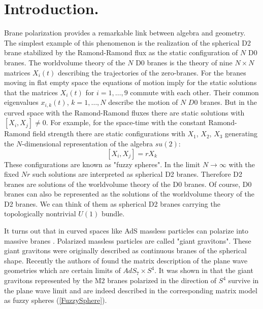 \documentclass[a4paper,12pt]{article}
\begin{document}
\section{Introduction.}
Brane polarization \cite{Myers} provides a remarkable link
between algebra and geometry. The simplest example of this
phenomenon is the realization of the spherical D2 brane
stabilized by the Ramond-Ramond flux as the static configuration
of $N$ D0 branes. The worldvolume theory of the $N$ D0 branes
is the theory of nine $N\times N$ matrices $X_i(t)$ describing the
trajectories of the zero-branes\cite{BoundStates}.
For the branes moving in flat
empty space the equations of motion imply for the static
solutions that the matrices
$X_i(t)$ for $i=1,\ldots,9$ commute with each other. Their
common eigenvalues $x_{i,k}(t)$, $k=1,\ldots, N$ describe
the motion of $N$ $D0$ branes.
But in the curved space with the Ramond-Ramond fluxes there
are static solutions with $[X_i, X_j]\neq 0$. For example,
for the space-time with the constant Ramond-Ramond field
strength there are static configurations with $X_1$, $X_2$, $X_3$
generating the $N$-dimensional representation of the algebra
$su(2)$:
\begin{equation}\label{FuzzySphere}
[X_i,X_j]=r X_k
\end{equation}
These configurations are known as "fuzzy spheres".
In the limit $N\to\infty$ with the fixed $Nr$ such solutions are
interpreted as spherical D2 branes. Therefore D2 branes are solutions
of the worldvolume theory of the D0 branes.
Of course, D0 branes can also be represented as the solutions of the
worldvolume theory of the D2 branes. We can think of them as spherical
D2 branes carrying the topologically nontrivial $U(1)$ bundle.


It turns out that in curved spaces like AdS massless particles
can polarize into massive branes \cite{MGST}. Polarized massless
particles are called "giant gravitons". These giant gravitons
were originally described as continuous branes of the
spherical shape.
Recently the authors of \cite{BMN} found the matrix description
of the plane wave geometries which are certain limits of
$AdS_7\times S^4$. It was shown in \cite{BMN} that the giant
gravitons represented by the M2 branes polarized in the direction
of $S^4$ survive in the  plane wave limit and are indeed described
in the corresponding matrix model as  fuzzy spheres (\ref{FuzzySphere}).
\end{document}
